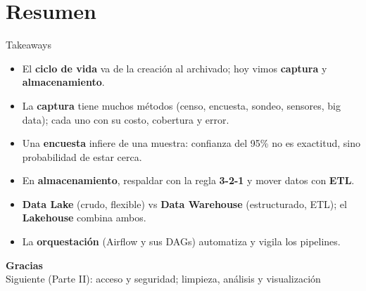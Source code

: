 \documentclass[aspectratio=169]{beamer}
\begin{document}
\section{Resumen}

\begin{frame}{Takeaways}
  \begin{itemize}
    \item El \textbf{ciclo de vida} va de la creaci\'on al archivado; hoy vimos
          \textbf{captura} y \textbf{almacenamiento}.
    \item La \textbf{captura} tiene muchos m\'etodos (censo, encuesta, sondeo,
          sensores, big data); cada uno con su costo, cobertura y error.
    \item Una \textbf{encuesta} infiere de una muestra: confianza del 95\% no es
          exactitud, sino probabilidad de estar cerca.
    \item En \textbf{almacenamiento}, respaldar con la regla \textbf{3-2-1} y
          mover datos con \textbf{ETL}.
    \item \textbf{Data Lake} (crudo, flexible) vs \textbf{Data Warehouse}
          (estructurado, ETL); el \textbf{Lakehouse} combina ambos.
    \item La \textbf{orquestaci\'on} (Airflow y sus DAGs) automatiza y vigila los
          pipelines.
  \end{itemize}
\end{frame}

\begin{frame}[plain]
  \molinaBanner
  \vfill
  \begin{center}
    {\color{molMorado}\Large\bfseries Gracias}\\[0.4em]
    {\color{molTeal} Siguiente (Parte II): acceso y seguridad; limpieza,
     an\'alisis y visualizaci\'on}
  \end{center}
  \vfill\vspace{1.0cm}
  \molinaLogos
\end{frame}
\end{document}
